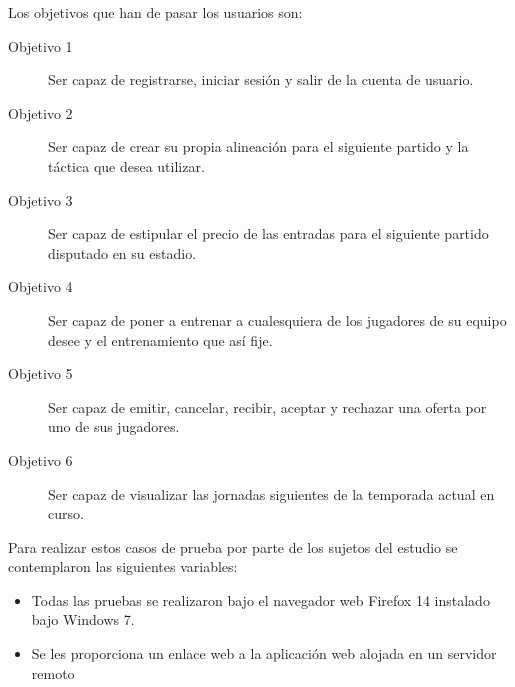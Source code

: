 Los objetivos que han de pasar los usuarios son:

\begin{description}
\item[Objetivo 1] Ser capaz de registrarse, iniciar sesión y salir de la cuenta de usuario.
\item[Objetivo 2] Ser capaz de crear su propia alineación para el siguiente
  partido y la táctica que desea utilizar.
\item[Objetivo 3] Ser capaz de estipular el precio de las entradas para el
  siguiente partido disputado en su estadio.
\item[Objetivo 4] Ser capaz de poner a entrenar a cualesquiera de los jugadores
  de su equipo desee y el entrenamiento que así fije.
\item[Objetivo 5] Ser capaz de emitir, cancelar, recibir, aceptar y rechazar una
  oferta por uno de sus jugadores.
\item[Objetivo 6] Ser capaz de visualizar las jornadas siguientes de la
  temporada actual en curso.
\end{description}

Para realizar estos casos de prueba por parte de los sujetos del estudio se
contemplaron las siguientes variables:

\begin{itemize}
\item Todas las pruebas se realizaron bajo el navegador web Firefox 14 instalado
  bajo Windows 7.
\item Se les proporciona un enlace web a la aplicación web alojada en un
  servidor remoto \cite{prog:pfc_sfo}
\end{itemize}